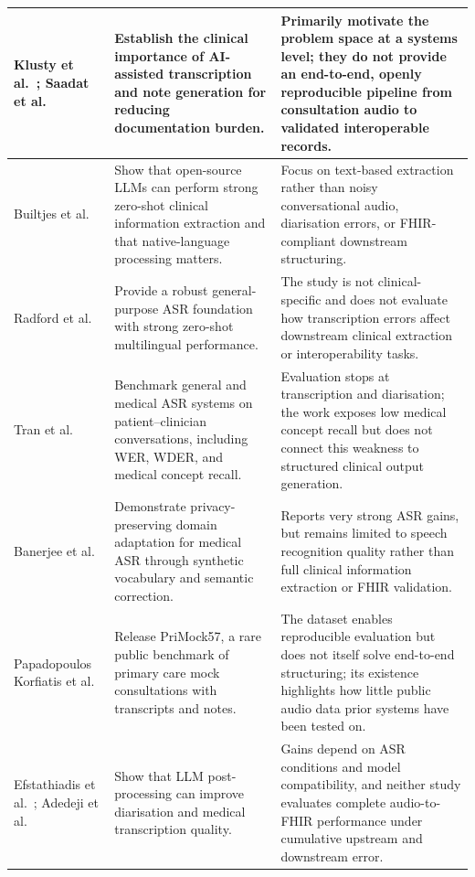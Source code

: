 \begin{longtable}{|>{\raggedright\arraybackslash}p{}|>{\raggedright\arraybackslash}p{}|>{\raggedright\arraybackslash}p{}|}
Klusty et al.\ \cite{klusty2024clinical}; Saadat et al.\ \cite{saadat2025enhancing} & Establish the clinical importance of AI-assisted transcription and note generation for reducing documentation burden. & Primarily motivate the problem space at a systems level; they do not provide an end-to-end, openly reproducible pipeline from consultation audio to validated interoperable records. \\
\hline
Builtjes et al.\ \cite{builtjes2025leveraging} & Show that open-source LLMs can perform strong zero-shot clinical information extraction and that native-language processing matters. & Focus on text-based extraction rather than noisy conversational audio, diarisation errors, or FHIR-compliant downstream structuring. \\
\hline
Radford et al.\ \cite{radford2023whisper} & Provide a robust general-purpose ASR foundation with strong zero-shot multilingual performance. & The study is not clinical-specific and does not evaluate how transcription errors affect downstream clinical extraction or interoperability tasks. \\
\hline
Tran et al.\ \cite{tran2022asr} & Benchmark general and medical ASR systems on patient--clinician conversations, including WER, WDER, and medical concept recall. & Evaluation stops at transcription and diarisation; the work exposes low medical concept recall but does not connect this weakness to structured clinical output generation. \\
\hline
Banerjee et al.\ \cite{banerjee2024medasr} & Demonstrate privacy-preserving domain adaptation for medical ASR through synthetic vocabulary and semantic correction. & Reports very strong ASR gains, but remains limited to speech recognition quality rather than full clinical information extraction or FHIR validation. \\
\hline
Papadopoulos Korfiatis et al.\ \cite{papadopoulos2022primock57} & Release PriMock57, a rare public benchmark of primary care mock consultations with transcripts and notes. & The dataset enables reproducible evaluation but does not itself solve end-to-end structuring; its existence highlights how little public audio data prior systems have been tested on. \\
\hline
Efstathiadis et al.\ \cite{efstathiadis2024diarization}; Adedeji et al.\ \cite{adedeji2024sound} & Show that LLM post-processing can improve diarisation and medical transcription quality. & Gains depend on ASR conditions and model compatibility, and neither study evaluates complete audio-to-FHIR performance under cumulative upstream and downstream error. \\

\end{longtable}
